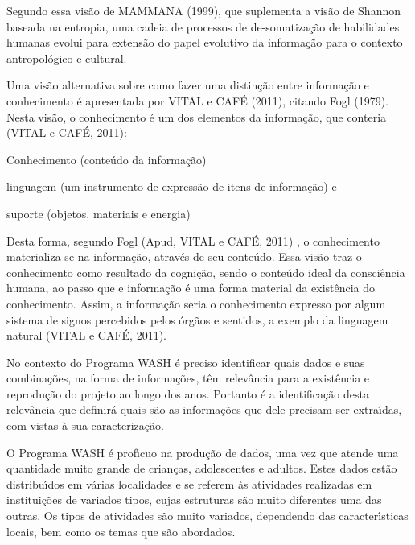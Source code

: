 \documentclass[
12pt,		%
openright,	%
twoside,  %
a4paper,			%
chapter=TITLE,		%
english,			%
french,				%
spanish,			%
brazil				%
]{USPSC-classe/USPSC}
\begin{document}
Segundo essa vis\~ao de  MAMMANA (1999), que suplementa a vis\~ao de Shannon baseada na entropia, uma cadeia de processos de de-somatiza\c{c}\~ao de habilidades humanas evolui para extens\~ao do papel evolutivo da informa\c{c}\~ao para o contexto antropol\'ogico e cultural.




Uma vis\~ao alternativa sobre como fazer uma distin\c{c}\~ao entre informa\c{c}\~ao e conhecimento \'e apresentada por  VITAL e CAF\'E (2011), citando Fogl (1979). Nesta vis\~ao, o conhecimento \'e um dos elementos da informa\c{c}\~ao, que conteria (VITAL e CAF\'E, 2011):





\begin{alineas}
\item Conhecimento (conte\'udo da informa\c{c}\~ao)
\item linguagem (um instrumento de express\~ao de itens de informa\c{c}\~ao) e
\item suporte (objetos, materiais e energia)
\end{alineas}

Desta forma, segundo Fogl  (Apud, VITAL e CAF\'E, 2011) , \textquotedbl o conhecimento materializa-se na informa\c{c}\~ao, atrav\'es de seu conte\'udo\textquotedbl . Essa vis\~ao traz o conhecimento como resultado da cogni\c{c}\~ao, sendo \textquotedbl o conte\'udo ideal da consci\^encia humana\textquotedbl , ao passo que e informa\c{c}\~ao \'e uma forma material da exist\^encia do conhecimento. Assim, a informa\c{c}\~ao seria o conhecimento expresso por algum \textquotedbl sistema de signos percebidos pelos \'org\~aos e sentidos\textquotedbl , a exemplo da linguagem natural  (VITAL e CAF\'E, 2011).




No contexto do Programa WASH \'e preciso identificar quais dados e suas combina\c{c}\~oes, na forma de informa\c{c}\~oes, t\^em relev\^ancia para a exist\^encia e reprodu\c{c}\~ao do projeto ao longo dos anos. Portanto \'e a identifica\c{c}\~ao desta relev\^ancia que definir\'a quais s\~ao as informa\c{c}\~oes que dele precisam ser extra\'{\i}das, com vistas \`a sua caracteriza\c{c}\~ao.




O Programa WASH \'e prof\'{\i}cuo na produ\c{c}\~ao de dados, uma vez que atende uma quantidade muito grande de crian\c{c}as, adolescentes e adultos. Estes dados est\~ao distribu\'{\i}dos em v\'arias localidades e se referem \`as atividades realizadas em institui\c{c}\~oes de variados tipos, cujas estruturas s\~ao muito diferentes uma das outras. Os tipos de atividades s\~ao muito variados, dependendo das caracter\'{\i}sticas locais, bem como os temas que s\~ao abordados.
\end{document}
